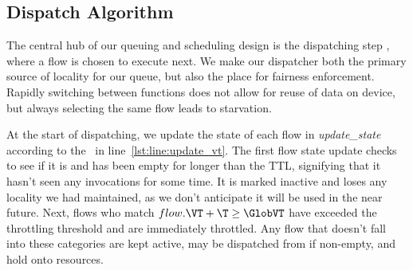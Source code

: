 \vspace*{\subsecspace}
\subsection{Dispatch Algorithm}
\label{sec:dispatch}

The central hub of our queuing and scheduling design is the dispatching step , where a flow is chosen to execute next.
We make our dispatcher both the primary source of locality for our queue, but also the place for fairness enforcement.
Rapidly switching between functions does not allow for reuse of data on device, but always selecting the same flow leads to starvation.


At the start of dispatching, we update the state of each flow in \emph{update\_state} according to the \GlobVT~in line~\ref{lst:line:update_vt}.
The first flow state update checks to see if it is and has been empty for longer than the TTL, signifying that it hasn't seen any invocations for some time.
It is marked inactive and loses any locality we had maintained, as we don't anticipate it will be used in the near future.
Next, flows who match $flow.\VT + \T \ge \GlobVT$ have exceeded the throttling threshold and are immediately throttled.
Any flow that doesn't fall into these categories are kept active, may be dispatched from if non-empty, and hold onto resources.

